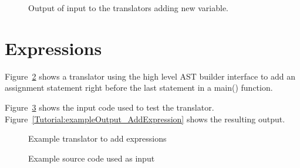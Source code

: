 \begin{figure}[!h]
{\indent
{\mySmallFontSize

\begin{latexonly}
   
\end{latexonly}

\begin{htmlonly}
   
\end{htmlonly}

}
}
\caption{Output of input to the translators adding new variable.}
\label{Tutorial:exampleOutput_AddVariableDeclaration}
\end{figure}


\clearpage
\section{Expressions}
Figure~\ref{Tutorial:exampleAddExpression} shows a translator
using the high level AST builder interface to add an assignment statement right
before the last statement in a main() function.  

   Figure~\ref{Tutorial:exampleInputCode_AddExpression} shows the
input code used to test the translator.
Figure~\ref{Tutorial:exampleOutput_AddExpression} shows the resulting output.

\begin{figure}[!ht]
{\indent
{\mySmallFontSize
\begin{latexonly}
   
\end{latexonly}
\begin{htmlonly}
   
\end{htmlonly}
}
}
\caption{Example translator to add expressions}
\label{Tutorial:exampleAddExpression}
\end{figure}

\begin{figure}[!ht]
{\indent
{\mySmallFontSize
\begin{latexonly}
   
\end{latexonly}
\begin{htmlonly}
   
\end{htmlonly}
}
}
\caption{Example source code used as input}
\label{Tutorial:exampleInputCode_AddExpression}
\end{figure}


